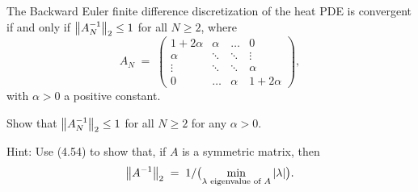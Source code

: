 \begin{exercises}
\item The Backward Euler finite difference discretization of the heat PDE is
convergent if and only if $\left\|A_N^{-1}\right\|_2 \leq 1$ for all $N \geq 2$, where
\[
A_N \;=\; \begin{pmatrix} 1+2\alpha & \alpha & \dots & 0\\ \alpha & \ddots & \ddots & \vdots\\ \vdots & \ddots & \ddots & \alpha\\ 0 & \dots & \alpha & 1+2\alpha \end{pmatrix},
\]
with $\alpha > 0$ a positive constant.

Show that $\left\|A_N^{-1}\right\|_2 \leq 1$ for all $N \geq 2$ for any $\alpha > 0$.

\noindent Hint: Use (4.54) to show that, if $A$ is a symmetric matrix, then
\[
\left\|A^{-1}\right\|_2 \;=\; 1/\bigl(\min_{\lambda \text{ eigenvalue of } A} |\lambda|\bigr).
\]

\end{exercises}

